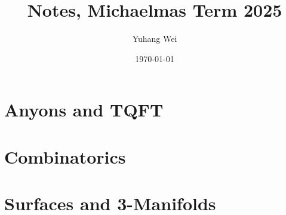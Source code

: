 \documentclass[11pt,a4paper]{book}
\theoremstyle{plain} %
\theoremstyle{definition} %
\theoremstyle{claimstyle}
\begin{document}
\title{Notes, Michaelmas Term 2025}
\author{Yuhang Wei}
\date{\today}
\maketitle
\tableofcontents


\chapter{Anyons and TQFT}





\chapter{Combinatorics}


\chapter{Surfaces and 3-Manifolds}



\newpage
\printbibliography
\end{document}
